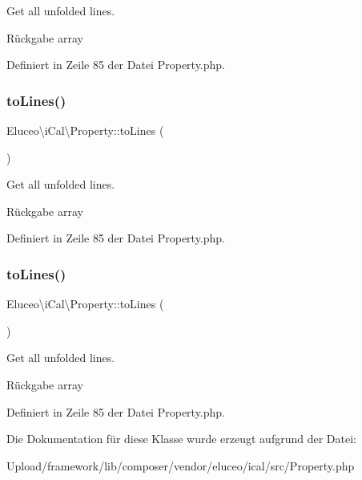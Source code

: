 Get all unfolded lines.

\begin{DoxyReturn}{Rückgabe}
array 
\end{DoxyReturn}


Definiert in Zeile 85 der Datei Property.\+php.

\mbox{\label{class_eluceo_1_1i_cal_1_1_property_a815fd5c038ec6f86b9f117f2e3d5bb7f}} 
\subsubsection{\texorpdfstring{to\+Lines()}{toLines()}\hspace{0.1cm}{\footnotesize\ttfamily [2/3]}}
{\footnotesize\ttfamily Eluceo\textbackslash{}i\+Cal\textbackslash{}\+Property\+::to\+Lines (\begin{DoxyParamCaption}{ }\end{DoxyParamCaption})}

Get all unfolded lines.

\begin{DoxyReturn}{Rückgabe}
array 
\end{DoxyReturn}


Definiert in Zeile 85 der Datei Property.\+php.

\mbox{\label{class_eluceo_1_1i_cal_1_1_property_a815fd5c038ec6f86b9f117f2e3d5bb7f}} 
\subsubsection{\texorpdfstring{to\+Lines()}{toLines()}\hspace{0.1cm}{\footnotesize\ttfamily [3/3]}}
{\footnotesize\ttfamily Eluceo\textbackslash{}i\+Cal\textbackslash{}\+Property\+::to\+Lines (\begin{DoxyParamCaption}{ }\end{DoxyParamCaption})}

Get all unfolded lines.

\begin{DoxyReturn}{Rückgabe}
array 
\end{DoxyReturn}


Definiert in Zeile 85 der Datei Property.\+php.



Die Dokumentation für diese Klasse wurde erzeugt aufgrund der Datei\+:\begin{DoxyCompactItemize}
\item 
Upload/framework/lib/composer/vendor/eluceo/ical/src/Property.\+php\end{DoxyCompactItemize}
